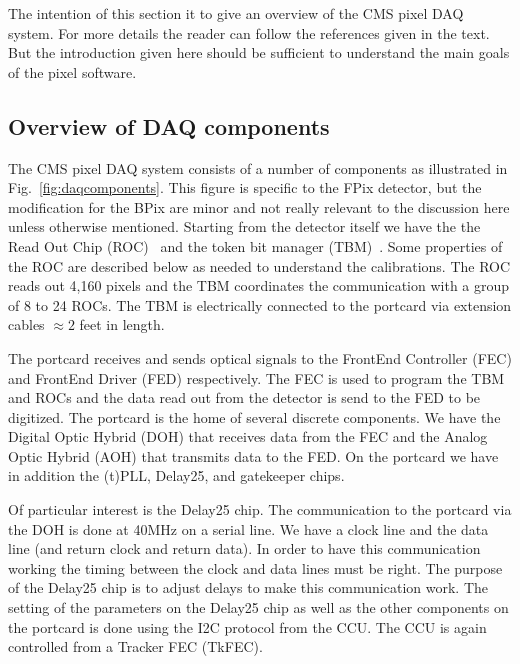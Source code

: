 
The intention of this section it to give an overview of
the CMS pixel DAQ system. For more details the reader
can follow the references given in the text. But the
introduction given here should be sufficient to understand
the main goals of the pixel software.

\subsection{Overview of DAQ components}

The CMS pixel DAQ system consists of a number of 
components as illustrated in Fig.~\ref{fig:daqcomponents}.
This figure is specific to the FPix detector, but the
modification for the BPix are minor and not really 
relevant to the discussion here unless otherwise 
mentioned. Starting from the detector itself we have the the
Read Out Chip (ROC)~\cite{ROC} and the token bit manager 
(TBM)~\cite{TBM}. Some properties of the ROC are described 
below as needed to understand the calibrations. The
ROC reads out 4,160 pixels and the TBM coordinates
the communication with a group of 8 to 24 ROCs.
The TBM is electrically connected to the portcard via
extension cables $\approx 2$ feet in length.

The portcard receives and sends optical signals to the
FrontEnd Controller (FEC) and FrontEnd Driver (FED)
respectively. The FEC is used to program the TBM 
and ROCs and the data read out from the detector is
send to the FED to be digitized. The portcard is the
home of several discrete components. We have the 
Digital Optic Hybrid (DOH) that receives data from
the FEC and the Analog Optic Hybrid (AOH) that 
transmits data to the FED. On the portcard we
have in addition the (t)PLL, Delay25, and gatekeeper
chips. 

Of particular interest is the Delay25 chip. The communication
to the portcard via the DOH is done at 40MHz on a serial
line. We have a clock line and the data line (and return clock
and return data). In order to have this communication
working the timing between the clock and data lines must
be right. The purpose of the Delay25 chip is to adjust
delays to make this communication work. The setting of the
parameters on the Delay25 chip as well as the other components
on the portcard is done using the I2C protocol from the
CCU. The CCU is again controlled from a Tracker FEC (TkFEC).

